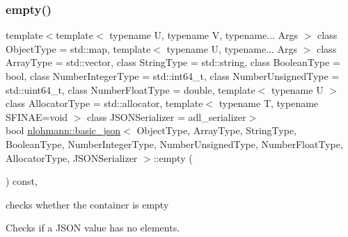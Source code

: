 \subsubsection{\texorpdfstring{empty()}{empty()}}
{\footnotesize\ttfamily template$<$template$<$ typename U, typename V, typename... Args $>$ class Object\+Type = std\+::map, template$<$ typename U, typename... Args $>$ class Array\+Type = std\+::vector, class String\+Type  = std\+::string, class Boolean\+Type  = bool, class Number\+Integer\+Type  = std\+::int64\+\_\+t, class Number\+Unsigned\+Type  = std\+::uint64\+\_\+t, class Number\+Float\+Type  = double, template$<$ typename U $>$ class Allocator\+Type = std\+::allocator, template$<$ typename T, typename S\+F\+I\+N\+A\+E=void $>$ class J\+S\+O\+N\+Serializer = adl\+\_\+serializer$>$ \\
bool \mbox{\hyperlink{classnlohmann_1_1basic__json}{nlohmann\+::basic\+\_\+json}}$<$ Object\+Type, Array\+Type, String\+Type, Boolean\+Type, Number\+Integer\+Type, Number\+Unsigned\+Type, Number\+Float\+Type, Allocator\+Type, J\+S\+O\+N\+Serializer $>$\+::empty (\begin{DoxyParamCaption}{ }\end{DoxyParamCaption}) const\hspace{0.3cm}{\ttfamily [inline]}, {\ttfamily [noexcept]}}



checks whether the container is empty 

Checks if a J\+S\+ON value has no elements.

